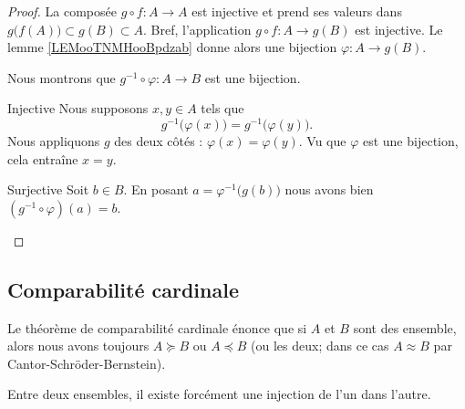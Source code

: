 \begin{proof}
    La composée \( g\circ f\colon A\to A\) est injective et prend ses valeurs dans \( g\big( f(A) \big)\subset g(B)\subset A\). Bref, l'application \( g\circ f\colon A \to g(B)\) est injective. Le lemme \ref{LEMooTNMHooBpdzab} donne alors une bijection \( \varphi\colon A\to g(B)\).

    Nous montrons que \( g^{-1}\circ\varphi\colon A\to B\) est une bijection.

    \begin{subproof}
        \item[Injective]
            Nous supposons \( x,y\in A\) tels que
            \begin{equation}
                g^{-1}\big( \varphi(x) \big)=g^{-1}\big( \varphi(y) \big).
            \end{equation}
            Nous appliquons \( g\) des deux côtés : \( \varphi(x)=\varphi(y)\). Vu que \( \varphi\) est une bijection, cela entraîne \( x=y\).
        \item[Surjective]
            Soit \( b\in B\). En posant \( a=\varphi^{-1}\big( g(b) \big)\) nous avons bien \( (g^{-1}\circ \varphi)(a)=b\).
    \end{subproof}
\end{proof}

\subsection{Comparabilité cardinale}

Le théorème de comparabilité cardinale énonce que si \( A\) et \( B\) sont des ensemble, alors nous avons toujours \( A\succeq B\) ou \( A\preceq B\) (ou les deux; dans ce cas \( A\approx B\) par Cantor-Schröder-Bernstein).
\begin{theorem}     \label{THOooCBSKooCmzfUf}
    Entre deux ensembles, il existe forcément une injection de l'un dans l'autre.
\end{theorem}

